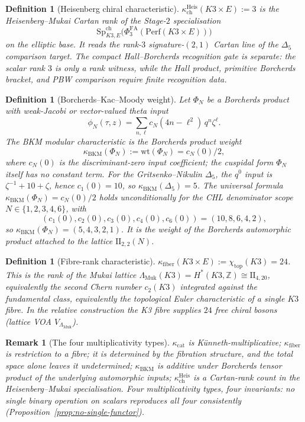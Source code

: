 \documentclass[11pt]{article}
\newtheorem{definition}[theorem]{Definition}
\newtheorem{remark}[theorem]{Remark}
\begin{document}
\begin{definition}[Heisenberg chiral characteristic]
\label{def:kappa-ch-heis}
$\kappa_{\mathrm{ch}}^{\mathrm{Heis}}(K3 \times E) := 3$
is the Heisenberg--Mukai Cartan rank of the Stage-$2$ specialisation
\[
\mathrm{Sp}^{\mathrm{ch}}_{K3,E}\!
\bigl(\Phi^{\mathrm{FA}}_3(\mathrm{Perf}(K3 \times E))\bigr)
\]
on the elliptic base. It reads the rank-$3$ signature-$(2,1)$
Cartan line of the $\Delta_5$ comparison target. The compact
Hall--Borcherds recognition gate is separate: the scalar rank
$3$ is only a rank witness, while the Hall product, primitive
Borcherds bracket, and PBW comparison require finite recognition data.
\end{definition}

\begin{definition}[Borcherds--Kac--Moody weight]
\label{def:kappa-BKM}
Let $\Phi_N$ be a Borcherds product with weak-Jacobi or
vector-valued theta input
\[
\phi_N(\tau,z)=\sum_{n,\ell} c_N(4n-\ell^2)\,q^n\zeta^\ell .
\]
The BKM modular characteristic is the Borcherds product weight
\[
\kappa_{\mathrm{BKM}}(\Phi_N) := \mathrm{wt}(\Phi_N)=c_N(0)/2,
\]
where $c_N(0)$ is the discriminant-zero input coefficient; the
cuspidal form $\Phi_N$ itself has no constant term. For the
Gritsenko--Nikulin $\Delta_5$, the $q^0$ input is
$\zeta^{-1}+10+\zeta$, hence $c_1(0) = 10$, so
$\kappa_{\mathrm{BKM}}(\Delta_5) = 5$. The universal formula
$\kappa_{\mathrm{BKM}}(\Phi_N) = c_N(0)/2$ holds unconditionally
for the CHL denominator scope $N \in \{1, 2, 3, 4, 6\}$, with
\[
 (c_1(0),c_2(0),c_3(0),c_4(0),c_6(0))=(10,8,6,4,2),
\]
so $\kappa_{\mathrm{BKM}}(\Phi_N)=(5,4,3,2,1)$. It is the weight of
the Borcherds automorphic product attached to the lattice
$\mathrm{II}_{2,2}(N)$.
\end{definition}

\begin{definition}[Fibre-rank characteristic]
\label{def:kappa-fiber}
$\kappa_{\mathrm{fiber}}(K3 \times E) :=
\chi_{\mathrm{top}}(K3) = 24$. This is the rank of the Mukai
lattice $\Lambda_{\mathrm{Muk}}(K3) = H^\ast(K3, \mathbb Z) \cong
\mathrm{II}_{4,20}$, equivalently the second Chern number
$c_2(K3)$ integrated against the fundamental class, equivalently
the topological Euler characteristic of a single $K3$ fibre.
In the relative construction the K3 fibre supplies
$24$ free chiral bosons (lattice VOA $V_{\Lambda_{\mathrm{Muk}}}$).
\end{definition}

\begin{remark}[The four multiplicativity types]
\label{rem:four-mult}
$\kappa_{\mathrm{cat}}$ is K\"unneth-multiplicative;
$\kappa_{\mathrm{fiber}}$ is restriction to a fibre; it is determined
by the fibration structure, and the total space alone leaves it
undetermined;
$\kappa_{\mathrm{BKM}}$ is additive under Borcherds tensor product
of the underlying automorphic inputs;
$\kappa_{\mathrm{ch}}^{\mathrm{Heis}}$ is a Cartan-rank count in the
Heisenberg--Mukai specialisation.
Four multiplicativity types, four invariants: no single binary
operation on scalars reproduces all four consistently
(Proposition~\ref{prop:no-single-functor}).
\end{remark}
\end{document}
